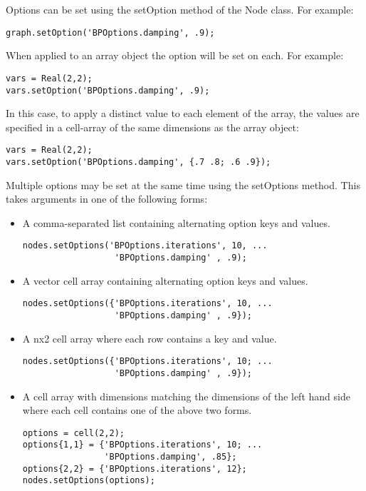 \ifmatlab
Options can be set using the setOption method of the Node class.  For example:

\begin{lstlisting}
graph.setOption('BPOptions.damping', .9);
\end{lstlisting}

When applied to an array object the option will be set on each.  For example:

\begin{lstlisting}
vars = Real(2,2);
vars.setOption('BPOptions.damping', .9);
\end{lstlisting}

In this case, to apply a distinct value to each element of the array, the values are specified in a cell-array of the same dimensions as the array object:

\begin{lstlisting}
vars = Real(2,2);
vars.setOption('BPOptions.damping', {.7 .8; .6 .9});
\end{lstlisting}

Multiple options may be set at the same time using the setOptions method. This takes arguments in one of the following forms:

\begin{itemize}
\item A comma-separated list containing alternating option keys and values.
\begin{lstlisting}
nodes.setOptions('BPOptions.iterations', 10, ...
                  'BPOptions.damping' , .9);
\end{lstlisting}
\item A vector cell array containing alternating option keys and values.
\begin{lstlisting}
nodes.setOptions({'BPOptions.iterations', 10, ...
                  'BPOptions.damping' , .9});
\end{lstlisting}
\item A nx2 cell array where each row contains a key and value.
\begin{lstlisting}
nodes.setOptions({'BPOptions.iterations', 10; ...
                  'BPOptions.damping' , .9});
\end{lstlisting}
\item A cell array with dimensions matching the dimensions of the left hand side where each cell contains one of the above two forms.
\begin{lstlisting}
options = cell(2,2);
options{1,1} = {'BPOptions.iterations', 10; ...
                'BPOptions.damping', .85};
options{2,2} = {'BPOptions.iterations', 12};
nodes.setOptions(options);
\end{lstlisting}
\end{itemize}


